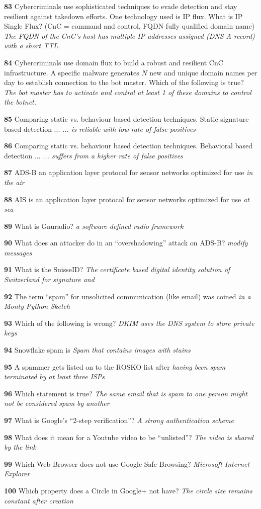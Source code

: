 \textbf{  83}  Cybercriminals use sophisticated techniques to evade detection and stay resilient against takedown efforts. One technology used is IP flux. What is IP Single Flux? (CnC = command and control, FQDN fully qualified domain name) 
\textit{ The FQDN of the CnC’s host has multiple IP addresses assigned (DNS A record) with a short TTL.}

\textbf{  84}  Cybercriminals use domain flux to build a robust and resilient CnC infrastructure. A specific malware generates $N$ new and unique domain names per day to establish connection to the bot master. Which of the following is true? 
\textit{ The bot master has to activate and control at least 1 of these domains to control the botnet.}

\textbf{  85}  Comparing static vs. behaviour based detection techniques. Static signature based detection ... 
\textit{ ... is reliable with low rate of false positives}

\textbf{  86}  Comparing static vs. behaviour based detection techniques. Behavioral based detection ... 
\textit{ ... suffers from a higher rate of false positives}

\textbf{  87}  ADS-B an application layer protocol for sensor networks optimized for use  
\textit{ in the air}

\textbf{  88}  AIS is an application layer protocol for sensor networks optimized for use  
\textit{ at sea}

\textbf{  89}  What is Gnuradio?  
\textit{ a software defined radio framework}

\textbf{  90}  What does an attacker do in an ``overshadowing'' attack on ADS-B?
\textit{ modify messages}

\textbf{  91}  What is the SuisseID?  
\textit{ The certificate based digital identity solution of Switzerland for signature and}

\textbf{  92}  The term ``spam'' for unsolicited communication (like email) was coined
\textit{ in a Monty Python Sketch}

\textbf{  93}  Which of the following is wrong?  
\textit{ DKIM uses the DNS system to store private keys}

\textbf{  94}  Snowflake spam is  
\textit{ Spam that contains images with stains}

\textbf{  95}  A spammer gets listed on to the ROSKO list after  
\textit{ having been spam terminated by at least three ISPs}

\textbf{  96}  Which statement is true?  
\textit{ The same email that is spam to one person might not be considered spam by another}

\textbf{  97}  What is Google's ``2-step verification''?
\textit{ A strong authentication scheme}

\textbf{  98}  What does it mean for a Youtube video to be ``unlisted''?
\textit{ The video is shared by the link}

\textbf{  99}  Which Web Browser does not use Google Safe Browsing?  
\textit{ Microsoft Internet Explorer}

\textbf{  100}  Which property does a Circle in Google+ not have? 
\textit{ The circle size remains constant after creation}
